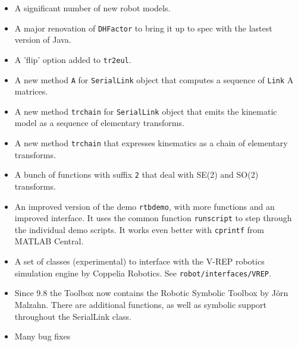 \documentclass[a4paper]{report}
\begin{document}
\begin{itemize}
\item A significant number of new robot models.
\item A major renovation of \texttt{DHFactor} to bring it up to spec with the lastest version of Java.
\item A 'flip' option added to \texttt{tr2eul}.
\item A new method \texttt{A} for \texttt{SerialLink} object that computes a sequence of \texttt{Link} A matrices.
\item A new method \texttt{trchain} for \texttt{SerialLink} object that emits the kinematic model as a sequence of elementary
transforms.
\item A new method \texttt{trchain} that expresses kinematics as a chain of elementary transforms.
\item A bunch of functions with suffix \texttt{2} that deal with SE(2) and SO(2) transforms.
\item An improved version of the demo \texttt{rtbdemo}, with more functions and an improved interface.  It uses the common
function \texttt{runscript} to step through the individual demo scripts.  It works even better with \texttt{cprintf} from MATLAB Central.
\item A set of classes (experimental) to interface with the V-REP robotics simulation engine by Coppelia Robotics.  See
\texttt{robot/interfaces/VREP}.
\item Since 9.8 the Toolbox now contains the Robotic Symbolic Toolbox
by J\"{o}rn Malzahn.  There are additional functions, as well as symbolic
support throughout the SerialLink class.
\item Many bug fixes
\end{itemize}
\end{document}
